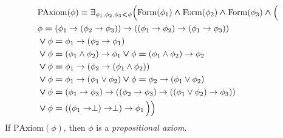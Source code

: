 \documentclass[10pt]{amsart}
\newcommand{\mexists}{\boldsymbol{\exists}}
\newcommand{\mand}{\boldsymbol{\wedge}}
\newcommand{\mor}{\boldsymbol{\vee}}
\newcommand{\mle}{\boldsymbol{<}}
\newcommand{\meq}{\boldsymbol{=}}
\begin{document}
\begin{definition}
	$$
		\begin{aligned}[t]
			 & \mathrm{PAxiom}(\phi) \equiv \mexists_{\phi_{\rm{1}},\phi_{\rm{2}},\phi_{\rm{3}} \mle \phi}\Bigl(\mathrm{Form}(\phi_{\rm{1}})\mand \mathrm{Form}(\phi_{\rm{2}}) \mand \mathrm{Form}(\phi_{\rm{3}}) \mand \Bigl( \\
			 & \begin{aligned}[t]
				    & \phi \meq \left(\phi_{\rm{1}}\ra \left(\phi_{\rm{2}}\ra \phi_{\rm{3}}\right)\right)\ra \left(\left(\phi_{\rm{1}} \ra \phi_{\rm{2}}\right) \ra \left(\phi_{\rm{1}} \ra \phi_{\rm{3}}\right)\right)         \\
				    & \mor \phi \meq \phi_{\rm{1}} \ra \left(\phi_{\rm{2}} \ra \phi_{\rm{1}}\right)                                                                                                                             \\
				    & \mor \phi \meq \left(\phi_{\rm{1}} \wedge \phi_{\rm{2}}\right)\ra \phi_{\rm{1}} \mor \phi \meq \left(\phi_{\rm{1}} \wedge \phi_{\rm{2}}\right) \ra \phi_{\rm{2}}                                          \\
				    & \mor \phi \meq \phi_{\rm{1}} \ra \left(\phi_{\rm{2}} \ra \left(\phi_{\rm{1}} \wedge \phi_{\rm{2}}\right)\right)                                                                                           \\
				    & \mor \phi \meq \phi_{\rm{1}} \ra \left(\phi_{\rm{1}} \vee \phi_{\rm{2}}\right) \mor \phi \meq \phi_{\rm{2}} \ra \left(\phi_{\rm{1}} \vee \phi_{\rm{2}}\right)                                             \\
				    & \mor \phi \meq \left(\phi_{\rm{1}} \ra \phi_{\rm{3}}\right) \ra \left(\left(\phi_{\rm{2}} \ra \phi_{\rm{3}}\right) \ra \left(\left(\phi_{\rm{1}} \vee \phi_{\rm{2}}\right)\ra \phi_{\rm{3}}\right)\right) \\
				    & \mor \phi \meq \left(\left(\phi_{\rm{1}} \ra \perp\right) \ra \perp\right) \ra \phi_{\rm{1}}\, \Bigr)\Bigr)                                                                                               \\
			   \end{aligned}
		\end{aligned}
	$$
	If $\mathrm{PAxiom}(\phi)$, then $\phi$ is a \textit{propositional axiom}.
\end{definition}
\end{document}
